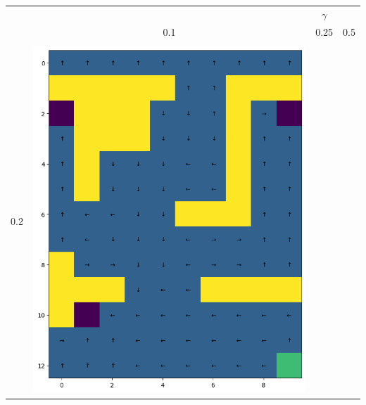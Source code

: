 \begin{landscape}
\begin{center}
    \begin{tabular}{c || c  c  c}
        & & $\gamma$ & \\
        & 0.1 & 0.25 & 0.5 \\
        \hline \hline \\
        0.2 & 
            \includegraphics[width=0.35\textheight]{assets/dp/analysis/prob_0.1_gamma_0.2_policy.png}
        & 

\end{tabular}
\end{center}
\end{landscape}
